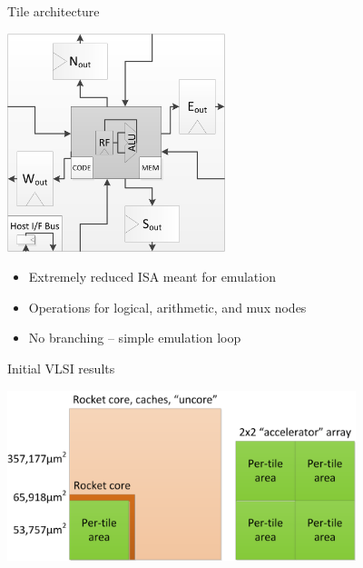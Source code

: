 \documentclass{beamer}
\begin{document}
\begin{frame}{Tile architecture}
\begin{center}
\includegraphics[width=2.5in]{tile.png}
\end{center}
\begin{itemize}
\item Extremely reduced ISA meant for emulation
\item Operations for logical, arithmetic, and mux nodes
\item No branching -- simple emulation loop
\end{itemize}
\end{frame}

\begin{frame}{Initial VLSI results}
\begin{center}
\includegraphics[width=4in]{size_comparisons_array_rocket.png}
\end{center}
\end{frame}
\end{document}
